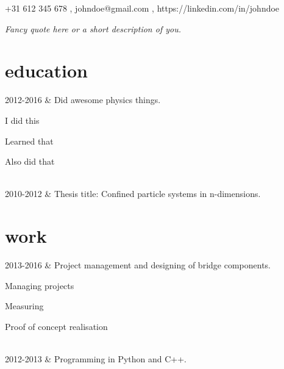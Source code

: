 \documentclass[changecolor={206, 23, 21}]{cv-roald}
\begin{document}
\pagestyle{empty} %

{\faMobile \hspace{\FAspace} +31 612 345 678 \sep \faEnvelope \hspace{\FAspace} johndoe@gmail.com \sep \faLinkedinSquare \hspace{\FAspace} https://linkedin.com/in/johndoe
}

\textit{Fancy quote here or a short description of you.}

\section*{education}
\begin{tabularcv}
	2012-2016   &   
	\newline Did awesome physics things.
	\begin{tabitemize}
		\item I did this
		\item Learned that
		\item Also did that
	\end{tabitemize} 
	\\[\vspacepar] %
	2010-2012   &   
	\newline Thesis title: Confined particle systems in n-dimensions.
\end{tabularcv}

\section*{work}
\begin{tabularcv}
	2013-2016   &   
	\newline Project management and designing of bridge components.
	\begin{tabitemize}
		\item Managing projects
		\item Measuring
		\item Proof of concept realisation
	\end{tabitemize} 
	\\[\vspacepar] %
	2012-2013   &   
	\newline Programming in Python and C++.
\end{tabularcv}   
\end{document}
